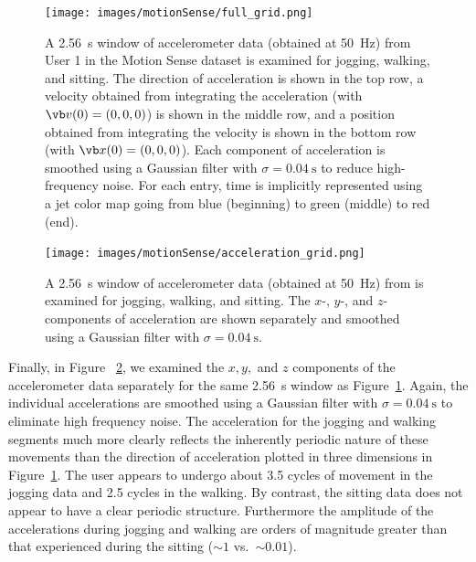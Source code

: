 \begin{figure}[ht]
\centering
\texttt{[image: images/motionSense/full\_grid.png]}  
\caption{A \SI{2.56}{\s} window of accelerometer data (obtained at \SI{50}{\Hz}) from User 1 in the Motion Sense dataset is examined for jogging, walking, and sitting. The direction of acceleration is shown in the top row, a velocity obtained from integrating the acceleration (with $\vb v(0) = (0,0,0)$) is shown in the middle row, and a position obtained from integrating the velocity is shown in the bottom row (with $\vb x(0) = (0,0,0)$). Each component of acceleration is smoothed using a Gaussian filter with $\sigma = \SI{0.04}{\s}$ to reduce high-frequency noise. For each entry, time is implicitly represented using a jet color map going from blue (beginning) to green (middle) to red (end).}
\label{fig:motionSense_grid}
\end{figure}


\begin{figure}[ht]
\centering
\texttt{[image: images/motionSense/acceleration\_grid.png]} 
\caption{A \SI{2.56}{\s} window of accelerometer data (obtained at \SI{50}{\Hz}) from is examined for jogging, walking, and sitting. The $x$-, $y$-, and $z$-components of acceleration are shown separately and smoothed using a Gaussian filter with $\sigma=\SI{0.04}{\s}$.}
\label{fig:motionSense_acc_grid}
\end{figure}

Finally, in Figure ~\ref{fig:motionSense_acc_grid}, we examined the $x,y,$ and $z$ components of the accelerometer data separately for the same \SI{2.56}{\s} window as Figure~\ref{fig:motionSense_grid}. Again, the individual accelerations are smoothed using a Gaussian filter with $\sigma=\SI{0.04}{\s}$ to eliminate high frequency noise. The acceleration for the jogging and walking segments much more clearly reflects the inherently periodic nature of these movements than the direction of acceleration plotted in three dimensions in Figure~\ref{fig:motionSense_grid}. The user appears to undergo about 3.5 cycles of movement in the jogging data and 2.5 cycles in the walking. By contrast, the sitting data does not appear to have a clear periodic structure. Furthermore the amplitude of the accelerations during jogging and walking are orders of magnitude greater than that experienced during the sitting ($\sim 1$ vs.\ $\sim 0.01$).

